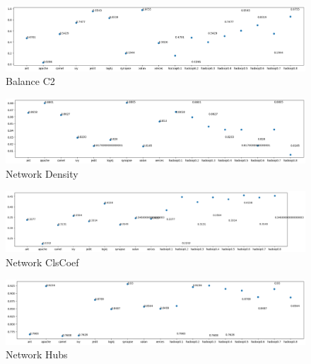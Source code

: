 \begin{figure}[h!]
    \includegraphics[width=\linewidth]{figures/balance-C2.png}
    \caption{Balance C2}
    \label{fig:balance-c2-big}
\end{figure}


\begin{figure}[h!]
    \includegraphics[width=\textwidth]{figures/network-Density.png}
    \caption{Network Density}
    \label{fig:network-density-big}
\end{figure}

\begin{figure}[h!]
    \includegraphics[width=\textwidth]{figures/network-ClsCoef.png}
    \caption{Network ClsCoef}
    \label{fig:network-clscoef-big}
\end{figure}

\begin{figure}[h!]
    \includegraphics[width=\textwidth]{figures/network-Hubs.png}
    \caption{Network Hubs}
    \label{fig:network-hubs-big}
\end{figure}


